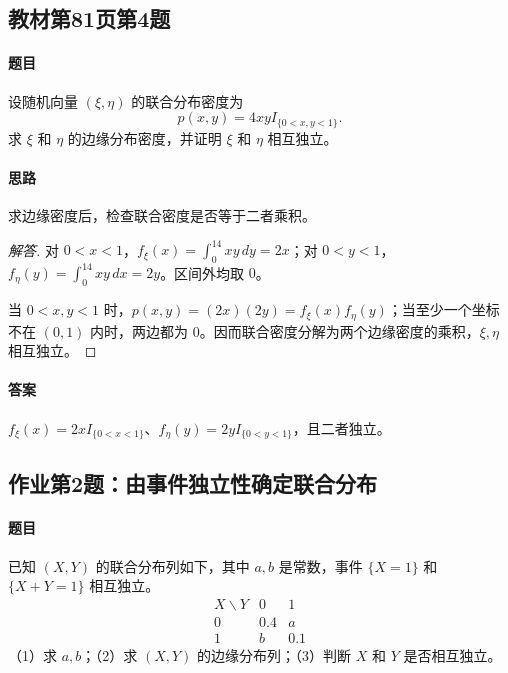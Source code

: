 \subsection{教材第81页第4题}\label{ex:w10-b81-4}
\paragraph{题目}
设随机向量 $(\xi,\eta)$ 的联合分布密度为
\[
p(x,y)=4xyI_{\{0<x,y<1\}}.
\]
求 $\xi$ 和 $\eta$ 的边缘分布密度，并证明 $\xi$ 和 $\eta$ 相互独立。
\paragraph{思路}求边缘密度后，检查联合密度是否等于二者乘积。
\begin{proof}[解答]
对 $0<x<1$，$f_\xi(x)=\int_0^14xy\,dy=2x$；对 $0<y<1$，$f_\eta(y)=\int_0^14xy\,dx=2y$。区间外均取 $0$。

当 $0<x,y<1$ 时，$p(x,y)=(2x)(2y)=f_\xi(x)f_\eta(y)$；当至少一个坐标不在 $(0,1)$ 内时，两边都为 $0$。因而联合密度分解为两个边缘密度的乘积，$\xi,\eta$ 相互独立。
\end{proof}
\paragraph{答案}$f_\xi(x)=2xI_{\{0<x<1\}}$、$f_\eta(y)=2yI_{\{0<y<1\}}$，且二者独立。

\subsection{作业第2题：由事件独立性确定联合分布}\label{ex:w10-h2}
\paragraph{题目}
已知 $(X,Y)$ 的联合分布列如下，其中 $a,b$ 是常数，事件 $\{X=1\}$ 和 $\{X+Y=1\}$ 相互独立。
\[
\begin{array}{c|cc}
X\backslash Y&0&1\\\hline
0&0.4&a\\
1&b&0.1
\end{array}
\]
（1）求 $a,b$；（2）求 $(X,Y)$ 的边缘分布列；（3）判断 $X$ 和 $Y$ 是否相互独立。
